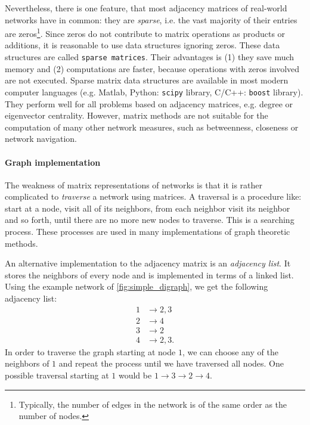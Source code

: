 Nevertheless, there is one feature, that most adjacency matrices of real-world networks have in common:
they are \emph{sparse}, i.e. the vast majority of their entries are zeros\footnote{Typically, the number of edges in the network is of the same order as the number of nodes.}.
Since zeros do not contribute to matrix operations as products or additions, it is reasonable to use data structures ignoring zeros.
These data structures are called \verb"sparse matrices".
Their advantages is (1) they save much memory and (2) computations are faster, because operations with zeros involved are not executed.
Sparse matrix data structures are available in most modern computer languages (e.g. Matlab, Python: \verb"scipy" library, C/C++: \verb"boost" library).
They perform well for all problems based on adjacency matrices, e.g. degree or eigenvector centrality.
However, matrix methods are not suitable for the computation of many other network measures, such as betweenness, closeness or network navigation.

\paragraph{Graph implementation\color{Cayenne}{.}}
The weakness of matrix representations of networks is that it is rather complicated to \emph{traverse} a network using matrices.
A traversal is a procedure like: start at a node, visit all of its neighbors, from each neighbor visit its neighbor and so forth, until there are no more new nodes to traverse.
This is a searching process.
These processes are used in many implementations of graph theoretic methods.

An alternative implementation to the adjacency matrix is an \emph{adjacency list}.
It stores the neighbors of every node and is implemented in terms of a linked list.
Using the example network of \ref{fig:simple_digraph}, we get the following adjacency list:
\begin{align*}
1 &\rightarrow 2,3 \\
2 &\rightarrow 4 \\
3 &\rightarrow 2 \\
4 &\rightarrow 2,3 .
\end{align*}
In order to traverse the graph starting at node $1$, we can choose any of the neighbors of $1$ and repeat the process until we have traversed all nodes.
One possible traversal starting at $1$ would be $1\rightarrow 3 \rightarrow 2 \rightarrow 4$.

